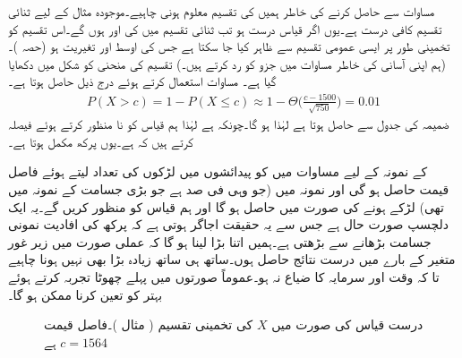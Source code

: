  مساوات  سے  حاصل کرنے کی خاطر ہمیں  کی تقسیم  معلوم ہونی چاہیے۔موجودہ مثال کے لیے ثنائی تقسیم کافی درست ہے۔یوں اگر قیاس درست ہو تب ثنائی تقسیم میں  کی  اور  ہوں گے۔اس تقسیم کو تخمینی طور پر ایسی عمومی تقسیم سے  ظاہر کیا جا سکتا ہے جس کی اوسط  اور تغیریت  ہو (حصہ )۔ (ہم اپنی آسانی کی خاطر مساوات  میں جزو  کو رد کرتے ہیں۔) تقسیم کی منحنی کو شکل  میں دکھایا گیا ہے۔ مساوات  استعمال کرتے ہوئے درج ذیل حاصل ہوتا ہے۔
\begin{align*}
P(X>c)=1-P(X\le c)\approx 1-\Theta\big(\frac{c-1500}{\sqrt{750}}\big)=0.01
\end{align*}
ضمیمہ  کی جدول  سے  حاصل ہوتا ہے  لہٰذا  ہو گا۔چونکہ  ہے لہٰذا ہم قیاس کو نا منظور کرتے ہوئے فیصلہ کرتے ہیں کہ  ہے۔یوں پرکھ مکمل ہوتا ہے۔

 کے نمونہ کے لیے  مساوات  میں  کو  پیدائشوں میں لڑکوں کی تعداد لیتے ہوئے  فاصل قیمت  حاصل ہو گی اور نمونہ میں  (جو وہی فی صد ہے جو  بڑی جسامت کے نمونہ میں تھی)  لڑکے ہونے کی صورت میں  حاصل ہو گا اور ہم قیاس کو منظور کریں گے۔یہ ایک دلچسپ صورت حال ہے جس سے یہ حقیقت اجاگر ہوتی ہے کہ پرکھ کی افادیت نمونی جسامت  بڑھانے سے بڑھتی ہے۔ہمیں  اتنا بڑا لینا ہو گا کہ عملی صورت میں زیر غور متغیر کے بارے میں درست نتائج حاصل ہوں۔ساتھ ہی ساتھ  زیادہ بڑا بھی نہیں ہونا چاہیے تا کہ وقت اور سرمایہ کا ضیاع نہ ہو۔عموماً صورتوں میں پہلے چھوٹا تجربہ کرتے ہوئے بہتر  کو تعین کرنا ممکن ہو گا۔  
\begin{figure}
\centering
{}
\caption{درست قیاس کی صورت میں $X$ کی تخمینی تقسیم ( مثال )۔فاصل قیمت $c=1564$ ہے}
\label{شکل_مثال_شماریات_لڑکا_یا_لڑکی}
\end{figure}

